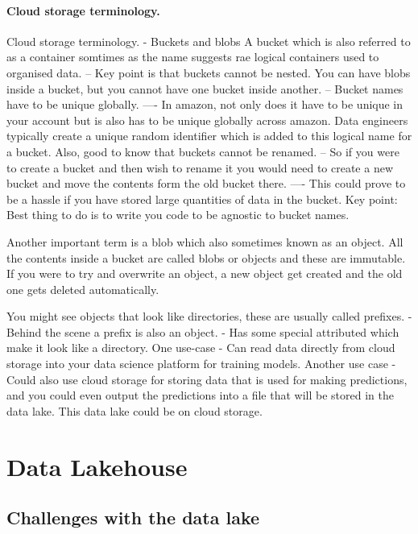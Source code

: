 \documentclass[a4paper, 11pt]{article}
\begin{document}
   \paragraph{Cloud storage terminology.}
    Cloud storage terminology.
    - Buckets and blobs
    A bucket which is also referred to as a container somtimes as the name suggests rae logical containers used to organised data.
    -- Key point is that buckets cannot be nested.
    You can have blobs inside a bucket, but you cannot have one bucket inside another.
    -- Bucket names have to be unique globally.
    ---- In amazon, not only does it have to be unique in your account but is also has to be unique globally across amazon.
    Data engineers typically create a unique random identifier which is added to this logical name for a bucket.
    Also, good to know that buckets cannot be renamed.
    -- So if you were to create a bucket and then wish to rename it you would need to create a new bucket and move the contents form the old bucket there.
    ---- This could prove to be a hassle if you have stored large quantities of data in the bucket.
    Key point: Best thing to do is to write you code to be agnostic to bucket names.

    Another important term is a blob which also sometimes known as an object.
    All the contents inside a bucket are called blobs or objects and these are immutable.
    If you were to try and overwrite an object, a new object get created and the old one gets deleted automatically.

    You might see objects that look like directories, these are usually called prefixes.
    - Behind the scene a prefix is also an object.
    - Has some special attributed which make it look like a directory.
    One use-case
    - Can read data directly from cloud storage into your data science platform for training models.
    Another use case
    - Could also use cloud storage for storing data that is used for making predictions, and you could even output the predictions into a file that will be stored in the data lake.
    This data lake could be on cloud storage.

    \section{Data Lakehouse}

    \subsection{Challenges with the data lake}
\end{document}
